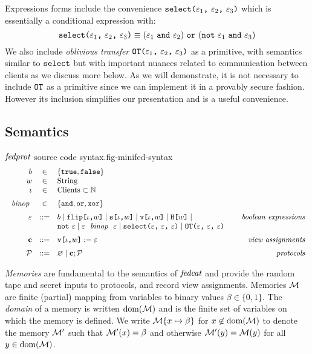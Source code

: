 Expressions forms include the convenience
$\texttt{select(} \varepsilon_1 \texttt{,}\ \varepsilon_2 \texttt{,}\ \varepsilon_3 \texttt{)}$ which is essentially a conditional
expression with:
$$
\texttt{select(} \varepsilon_1 \texttt{,}\ \varepsilon_2 \texttt{,}\ \varepsilon_3 \texttt{)} \equiv (\varepsilon_1\ \texttt{and}\ \varepsilon_2)\ \texttt{or}\ (\texttt{not}\ \varepsilon_1\ \texttt{and}\ \varepsilon_3)
$$
We also include \emph{oblivious transfer} $\texttt{OT(} \varepsilon_1 \texttt{,}\ \varepsilon_2 \texttt{,}\ \varepsilon_3 \texttt{)}$ as a primitive,
with semantics similar to $\texttt{select}$ but with important nuances
related to communication between clients as we discuss more below.
As we will demonstrate, it is not necessary to include $\texttt{OT}$
as a primitive since we can implement it in a provably secure
fashion. However its inclusion simplifies our presentation and is a useful
convenience.

\subsection{Semantics}

\begin{fpfig}[t]{$\mathit{fedprot}$ source code syntax.}{fig-minifed-syntax}
$$
\begin{array}{rcl@{\hspace{8mm}}r}
b &\in& \{ \etrue, \efalse \} \\
w &\in& \mathrm{String} \\ 
\cid &\in& \mathrm{Clients} \subset  \mathbb{N} \\[2mm]%
\bop &\in& \{ \eand, \eor, \exor \} \\[2mm]
\be &::=& b \mid \flip{\cid}{w} \mid \secret{\cid}{w} \mid \view{\cid}{w} \mid \oracle{w} \mid & \textit{boolean expressions}\\
& &  \enot\ \be \mid \be\ \bop\ \be \mid \select{\be}{\be}{\be} \mid \OT{\be}{\be}{\be} \\[2mm]
\instr &::=& \eassign{\view{\cid}{w}}{\be} & \textit{view assignments} \\[2mm]
\prog &::=& \varnothing \mid \instr; \prog & \textit{protocols}
\end{array}
$$ 
\end{fpfig}

\emph{Memories} are fundamental to the semantics of $\mathit{fedcat}$ and
provide the random tape and secret inputs to protocols, and record
view assignments. Memories $\mathcal{M}$ are finite (partial) mapping from
variables to binary values $\beta \in \{0,1\}$. The \emph{domain} of a
memory is written $\mathrm{dom}(\mathcal{M})$ and is the finite set of variables on
which the memory is defined. We write $\mathcal{M}\{ x \mapsto \beta\}$ for
$x\not\in\mathrm{dom}(\mathcal{M})$ to denote the memory $\mathcal{M}'$ such that
$\mathcal{M}'(x) = \beta$ and otherwise $\mathcal{M}'(y) = \mathcal{M}(y)$ for all $y \in
\mathrm{dom}(\mathcal{M})$.

